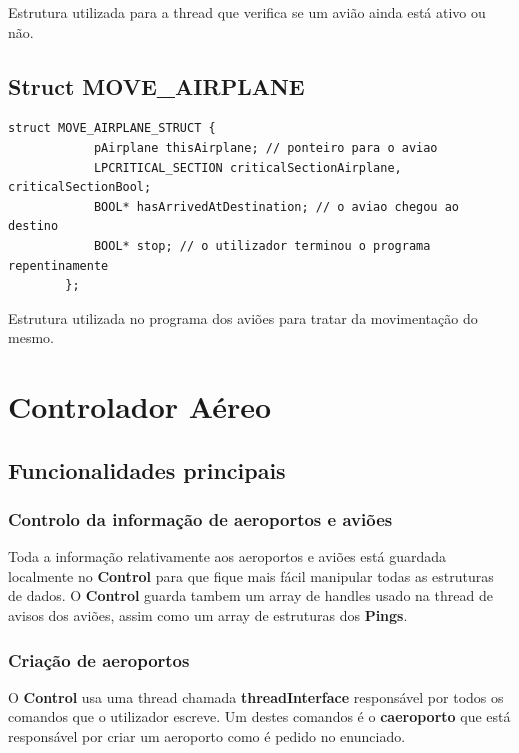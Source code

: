 \documentclass[11pt]{article}
\begin{document}
	Estrutura utilizada para a thread que verifica se um avião ainda está ativo ou não.


	\large
	\subsection{Struct MOVE\_AIRPLANE}
	\normalsize
	
	\begin{lstlisting}[caption=Struct MOVE\_AIRPLANE\_STRUCT]
        struct MOVE_AIRPLANE_STRUCT {
        	pAirplane thisAirplane; // ponteiro para o aviao
        	LPCRITICAL_SECTION criticalSectionAirplane, criticalSectionBool;
        	BOOL* hasArrivedAtDestination; // o aviao chegou ao destino
        	BOOL* stop; // o utilizador terminou o programa repentinamente
        };
	\end{lstlisting}
	
	Estrutura utilizada no programa dos aviões para tratar da movimentação do mesmo.
	
	
	\large
	\section{Controlador Aéreo}
	\subsection{Funcionalidades principais}
	\subsubsection{Controlo da informação de aeroportos e aviões}
	\normalsize
	
    Toda a informação relativamente aos aeroportos e aviões está guardada localmente no \textbf{Control} para que fique mais fácil manipular todas as estruturas de dados.
    O \textbf{Control} guarda tambem um array de handles usado na thread de avisos dos aviões, assim como um array de estruturas dos \textbf{Pings}.
	
	
	\large
	\subsubsection{Criação de aeroportos}
	\normalsize
	
	O \textbf{Control} usa uma thread chamada \textbf{threadInterface} responsável por todos os comandos que o utilizador escreve. Um destes comandos é o \textbf{caeroporto} que está responsável por criar um aeroporto como é pedido no enunciado.
	
\end{document}
